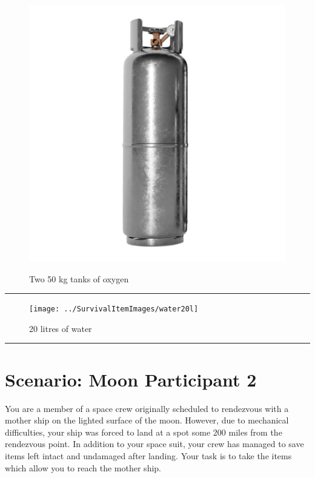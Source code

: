 \documentclass{article}
\begin{document}
    \begin{figure}[H]
        \centering
        \begin{minipage}{0.25\textwidth}
            \centering
            \includegraphics[width=\textwidth]{../SurvivalItemImages/oxygen}
        \end{minipage}\hfill
        \begin{minipage}{0.7\textwidth}
            \centering
            \Large Two 50 kg tanks of oxygen
        \end{minipage}
    \end{figure}
    \vspace{-0.8em}
    \noindent\rule{\textwidth}{0.4pt}
            
    \begin{figure}[H]
        \centering
        \begin{minipage}{0.25\textwidth}
            \centering
            \texttt{[image: ../SurvivalItemImages/water20l]}
        \end{minipage}\hfill
        \begin{minipage}{0.7\textwidth}
            \centering
            \Large 20 litres of water
        \end{minipage}
    \end{figure}
    \vspace{-0.8em}
    \noindent\rule{\textwidth}{0.4pt}
            
    \clearpage
    \section*{Scenario: \textmd{Moon} \hfill Participant \textmd{2}}
    \Large You are a member of a space crew originally scheduled to rendezvous with a mother ship on the lighted surface of the moon. However, due to mechanical difficulties, your ship was forced to land at a spot some 200 miles from the rendezvous point. In addition to your space suit, your crew has managed to save items left intact and undamaged after landing. Your task is to take the items which allow you to reach the mother ship.
\clearpage
        
\end{document}
